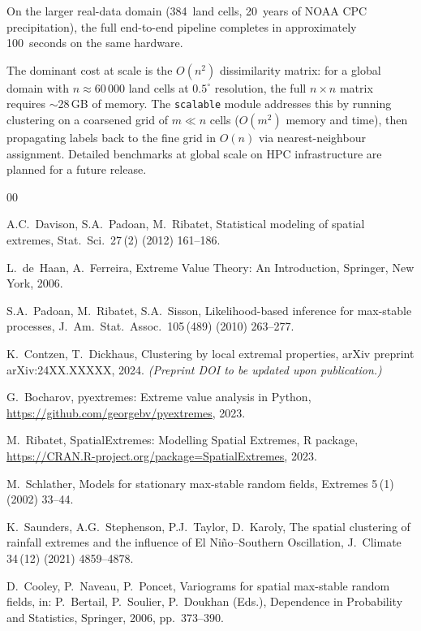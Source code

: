 \documentclass[preprint,12pt,a4paper]{elsarticle}
\begin{document}
On the larger real-data domain (384~land cells, 20~years of NOAA CPC
precipitation), the full end-to-end pipeline completes in
approximately 100~seconds on the same hardware.

The dominant cost at scale is the $O(n^2)$ dissimilarity matrix:
for a global domain with $n \approx 60\,000$ land cells at
$0.5^\circ$ resolution, the full $n \times n$ matrix requires
$\sim$28\,GB of memory.  The \texttt{scalable} module addresses
this by running clustering on a coarsened grid of $m \ll n$ cells
($O(m^2)$ memory and time), then propagating labels back to the
fine grid in $O(n)$ via nearest-neighbour assignment.  Detailed
benchmarks at global scale on HPC infrastructure are planned for a
future release.

\begin{thebibliography}{00}

A.C.~Davison, S.A.~Padoan, M.~Ribatet,
Statistical modeling of spatial extremes,
Stat.\ Sci.\ 27\,(2) (2012) 161--186.

L.~de~Haan, A.~Ferreira,
Extreme Value Theory: An Introduction,
Springer, New York, 2006.

S.A.~Padoan, M.~Ribatet, S.A.~Sisson,
Likelihood-based inference for max-stable processes,
J.\ Am.\ Stat.\ Assoc.\ 105\,(489) (2010) 263--277.

K.~Contzen, T.~Dickhaus,
Clustering by local extremal properties,
arXiv preprint arXiv:24XX.XXXXX, 2024.
\textit{(Preprint DOI to be updated upon publication.)}

G.~Bocharov,
pyextremes: Extreme value analysis in Python,
\url{https://github.com/georgebv/pyextremes}, 2023.

M.~Ribatet,
SpatialExtremes: Modelling Spatial Extremes,
R package, \url{https://CRAN.R-project.org/package=SpatialExtremes}, 2023.

M.~Schlather,
Models for stationary max-stable random fields,
Extremes 5\,(1) (2002) 33--44.

K.~Saunders, A.G.~Stephenson, P.J.~Taylor, D.~Karoly,
The spatial clustering of rainfall extremes and the influence of
El Ni\~{n}o--Southern Oscillation,
J.\ Climate 34\,(12) (2021) 4859--4878.

D.~Cooley, P.~Naveau, P.~Poncet,
Variograms for spatial max-stable random fields,
in: P.~Bertail, P.~Soulier, P.~Doukhan (Eds.),
Dependence in Probability and Statistics,
Springer, 2006, pp.~373--390.

\end{thebibliography}
\end{document}
